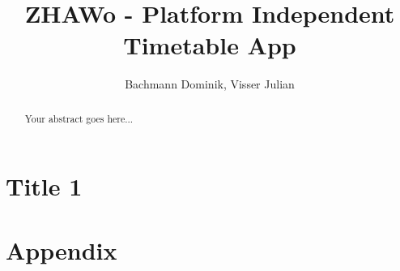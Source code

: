 \documentclass[english, a4paper,12pt]{article}
\title{ZHAWo - Platform Independent Timetable App}
\author{Bachmann Dominik, Visser Julian}
\begin{document}
	\begin{titlepage}
		\maketitle
	\end{titlepage}


	\newpage
	\tableofcontents
	\newpage
	\renewcommand{\abstractname}{Abstract}
	\begin{abstract}
		Your abstract goes here...
	\end{abstract}

	\newpage
	\section{Title 1}
	\blindtext
	\cite{DUMMY}

	\newpage

	\section{Appendix}

	\listoffigures
	\listoftables
	\printbibliography  %
\end{document}
